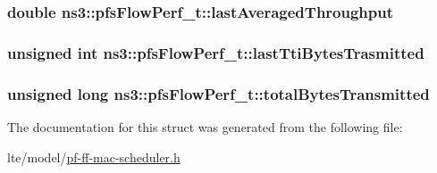 \subsubsection[{\texorpdfstring{last\+Averaged\+Throughput}{lastAveragedThroughput}}]{\setlength{\rightskip}{0pt plus 5cm}double ns3\+::pfs\+Flow\+Perf\+\_\+t\+::last\+Averaged\+Throughput}\hypertarget{structns3_1_1pfsFlowPerf__t_a6c5cfb351e700e78b7046d535c76b8d8}{}\label{structns3_1_1pfsFlowPerf__t_a6c5cfb351e700e78b7046d535c76b8d8}
\subsubsection[{\texorpdfstring{last\+Tti\+Bytes\+Trasmitted}{lastTtiBytesTrasmitted}}]{\setlength{\rightskip}{0pt plus 5cm}unsigned int ns3\+::pfs\+Flow\+Perf\+\_\+t\+::last\+Tti\+Bytes\+Trasmitted}\hypertarget{structns3_1_1pfsFlowPerf__t_ab95ef0042e2fd28be31982046b9485a9}{}\label{structns3_1_1pfsFlowPerf__t_ab95ef0042e2fd28be31982046b9485a9}
\subsubsection[{\texorpdfstring{total\+Bytes\+Transmitted}{totalBytesTransmitted}}]{\setlength{\rightskip}{0pt plus 5cm}unsigned {\bf long} ns3\+::pfs\+Flow\+Perf\+\_\+t\+::total\+Bytes\+Transmitted}\hypertarget{structns3_1_1pfsFlowPerf__t_a12642f04c523bb4790ea004ecaabd2cf}{}\label{structns3_1_1pfsFlowPerf__t_a12642f04c523bb4790ea004ecaabd2cf}


The documentation for this struct was generated from the following file\+:\begin{DoxyCompactItemize}
\item 
lte/model/\hyperlink{lte_2model_2pf-ff-mac-scheduler_8h}{pf-\/ff-\/mac-\/scheduler.\+h}\end{DoxyCompactItemize}
